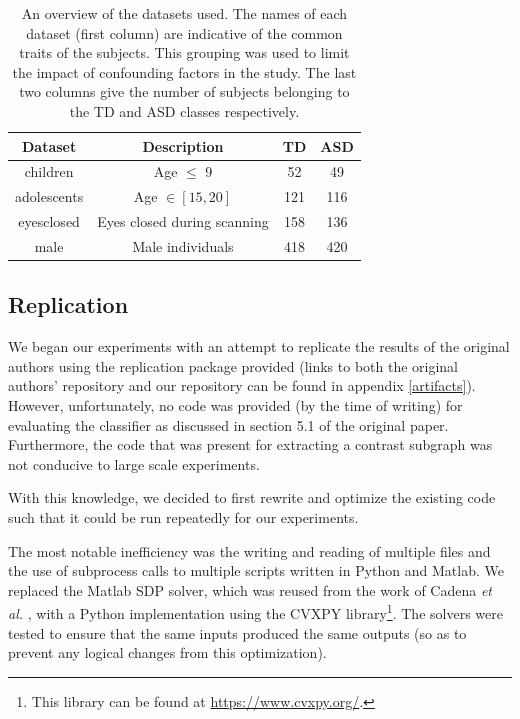 \documentclass[sigconf]{acmart}
\begin{document}
\begin{table}%
    \centering
    \caption{An overview of the datasets used. The names of each dataset (first column) are indicative of the common traits of the subjects. This grouping was used to limit the impact of confounding factors in the study. The last two columns give the number of subjects belonging to the TD and ASD classes respectively.}
    \begin{tabular}{c c c c}
        \hline
        Dataset & Description & TD & ASD \\
        \hline
        children &  Age $\leq$ 9 & 52 & 49 \\
        adolescents &  Age $\in [15,20]$ & 121 & 116 \\
        eyesclosed &  Eyes closed during scanning & 158 & 136 \\
        male &  Male individuals & 418 & 420 \\
        \hline
    \end{tabular}
    \label{tab:datasets}
\end{table}

\subsection{Replication} \label{replication}

We began our experiments with an attempt to replicate the results of the original authors using the replication package provided (links to both the original authors' repository and our repository can be found in appendix \ref{artifacts}).
However, unfortunately, no code was provided (by the time of writing) for evaluating the classifier as discussed in section 5.1 of the original paper.
Furthermore, the code that was present for extracting a contrast subgraph was not conducive to large scale experiments.

With this knowledge, we decided to first rewrite and optimize the existing code such that it could be run repeatedly for our experiments.

The most notable inefficiency was the writing and reading of multiple files and the use of subprocess calls to multiple scripts written in Python and Matlab.
We replaced the Matlab SDP solver, which was reused from the work of Cadena \emph{et al.} \cite{cadena2016}, with a Python implementation using the CVXPY library\footnote{This library can be found at \url{https://www.cvxpy.org/}.}.
The solvers were tested to ensure that the same inputs produced the same outputs (so as to prevent any logical changes from this optimization).
\end{document}
